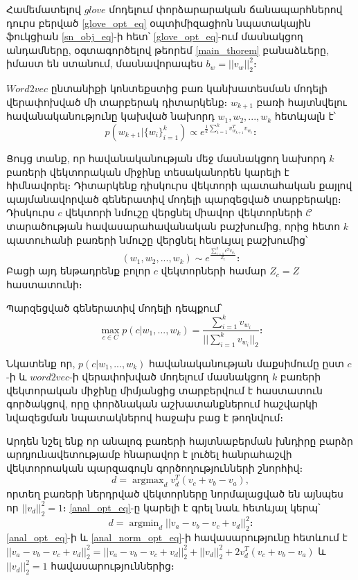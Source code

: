 \documentclass[11pt]{article}
\DeclareMathOperator*{\argmax}{argmax}
\DeclareMathOperator*{\argmin}{argmin}
\begin{document}
Համեմատելով $glove$ մոդելում փորձարարական ճանապարհներով դուրս բերված \ref{glove_opt_eq} օպտիմիզացիոն նպատակային ֆուկցիան \ref{sn_obj_eq}-ի հետ՝  \ref{glove_opt_eq}-ում մասնակցող անդամները, օգտագործելով թեորեմ \ref{main_thorem} բանաձևերը, իմաստ են ստանում, մասնավորապես $b_w = ||v_w||_2^2$։
\par $Word2vec$ ընտանիքի կոնտեքստից բառ կանխատեսման մոդելի վերափոխված մի տարբերակ դիտարկենք։ $w_{k+1}$ բառի հայտնվելու հավանականությունը կախված նախորդ $w_1, w_2, ..., w_k$ հետևյալն է՝
\begin{equation}
p(w_{k+1}| \{w_i\}_{i=1}^k) \propto e^{\frac{1}{k}\sum_{i=1}^{k}{v^T_{w_{k+1}}v_{w_i}}}։
\label{cbow_eq}
\end{equation}
\par Ցույց տանք, որ հավանականության մեջ մասնակցող նախորդ $k$ բառերի վեկտորական միջինը տեսականորեն կարելի է հիմնավորել։ Դիտարկենք դիսկուրս վեկտորի պատահական քայլով պայմանավորված գեներատիվ մոդելի պարզեցված տարբերակը։ Դիսկուրս $c$ վեկտորի նմուշը վերցնել միավոր վեկտորների $\mathcal{C}$ տարածության հավասարահավանական բաշխումից, որից հետո $k$ պատուհանի բառերի նմուշը վերցնել հետևյալ բաշխումից՝
 $$(w_1, w_2, ..., w_k) \sim e^{\frac{\sum_{i=1}^{k}{c^Tv_{w_i}}}{Z_c}}։$$ Բացի այդ ենթադրենք բոլոր $c$ վեկտորների համար $Z_c = Z$ հաստատունի։
 
 \begin{preposition}
 Պարզեցված գեներատիվ մոդելի դեպքում՝
 $$\max_{c  \in C}{p(c|w_1, ..., w_k)} = \frac{\sum_{i=1}^{k}{v_{w_i}}}{||\sum_{i=1}^{k}{v_{w_i}}||_2}։$$
 
 \end{preposition}
 
 Նկատենք որ, $p(c|w_1, ..., w_k)$ հավանականության մաքսիմումը  ըստ $c$-ի և $word2vec$-ի վերափոխված մոդելում մասնակցող $k$ բառերի վեկտորական միջինը միմյանցից տարբերվում է հաստատուն գործակցով, որը փորձնական աշխատանքներում հաշվարկի նվազեցման նպատակներով հաջախ բաց է թողնվում։
 
 \par Արդեն նշել ենք որ անալոգ բառերի հայտնաբերման խնդիրը բարձր արդյունավետությամբ հնարավոր է լուծել հանրահաշվի վեկտորոական պարզագույն գործողությունների շնորհիվ։
 \begin{equation}
 d = \argmax_{d} v^T_d(v_c+v_b-v_a),
 \label{anal_opt_eq}
 \end{equation}
 որտեղ բառերի ներդրված վեկտորները նորմալացված են այնպես որ $||v_d||_2^2 = 1$։ \ref{anal_opt_eq}-ը կարելի է գրել նաև հետևյալ կերպ՝
 \begin{equation}
 d = \argmin_{d} || v_a - v_b - v_c + v_d||_2^2։
  \label{anal_norm_opt_eq}
 \end{equation} 
\ref{anal_opt_eq}-ի և \ref{anal_norm_opt_eq}-ի հավասարությունը  հետևում է $||v_a - v_b - v_c + v_d||_2^2 =  ||v_a - v_b - v_c + v_d||_2^2 + ||v_d||_2^2 + 2v^T_d(v_c+v_b-v_a)$ և $||v_d||_2^2 = 1$ հավասարություններից։
\pagebreak
\end{document}
